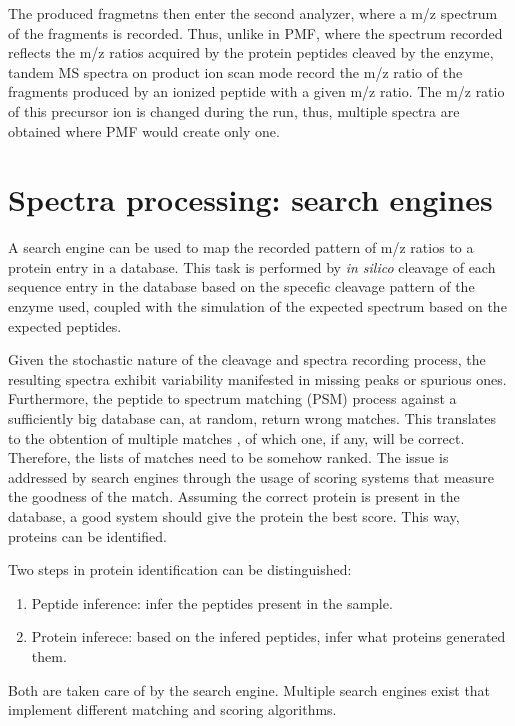 \documentclass[11pt, a4paper]{report}
\begin{document}
The produced fragmetns then enter the second analyzer, where a m/z spectrum of the fragments is recorded. Thus, unlike in PMF, where the spectrum recorded reflects the m/z ratios acquired by the protein peptides cleaved by the enzyme, tandem MS spectra on product ion scan mode record the m/z ratio of the fragments produced by an ionized peptide with a given m/z ratio. The m/z ratio of this precursor ion is changed during the run, thus, multiple spectra are obtained where PMF would create only one.


\section{Spectra processing: search engines}
\label{sec:search_engines}

A search engine can be used to map the recorded pattern of m/z ratios to a protein entry in a database. This task is performed by \textit{in silico} cleavage of each sequence entry in the database based on the specefic cleavage pattern of the enzyme used, coupled with the simulation of the expected spectrum based on the expected peptides.

Given the stochastic nature of the cleavage and spectra recording process, the resulting spectra exhibit variability manifested in missing peaks or spurious ones. Furthermore, the peptide to spectrum matching (PSM) process against a sufficiently big database can, at random, return wrong matches. This translates to the obtention of multiple matches , of which one, if any, will be correct. Therefore, the lists of matches need to be somehow ranked. The issue is addressed by search engines through the usage of scoring systems that measure the goodness of the match. Assuming the correct protein is present in the database, a good system should give the protein the best score. This way, proteins can be identified.

Two steps in protein identification can be distinguished:

\begin{enumerate}

\item Peptide inference: infer the peptides present in the sample.
\item Protein inferece: based on the infered peptides, infer what proteins generated them.
\end{enumerate}

Both are taken care of by the search engine. Multiple search engines exist that implement different matching and scoring algorithms.
\end{document}
